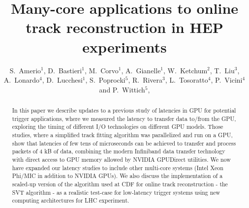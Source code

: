 \documentclass[letterpaper]{jpconf}
\begin{document}
\title{Many-core applications to online track reconstruction in HEP experiments}
\author{S.~Amerio$^1$, 
  D.~Bastieri$^1$, 
  M.~Corvo$^1$, 
  A.~Gianelle$^1$, 
  W.~Ketchum$^2$,
  T.~Liu$^3$, 
  A.~Lonardo$^4$, 
  D.~Lucchesi$^1$,
  S.~Poprocki$^5$, 
  R.~Rivera$^3$, 
  L.~Tosoratto$^4$,
  P.~Vicini$^4$
  and 
  P.~Wittich$^5$,
}
\address{$^1$ INFN and University of Padova, Italy}
\address{$^2$ Los Alamos National Laboratory, New Mexico, USA}
\address{$^3$ Fermi National Accelerator Laboratory, Illinois, USA}
\address{$^4$ INFN Roma, Italy}
\address{$^5$ Cornell University, New York, USA}


\begin{abstract}
  In this paper we describe updates to a previous study of latencies
  in GPU for potential trigger applications, where we measured the
  latency to transfer data to/from the GPU, exploring the timing of
  different I/O technologies on different GPU models.  Those studies,
  where a simplified track fitting algorithm was parallelized and run
  on a GPU, show that latencies of few tens of microseconds can be
  achieved to transfer and process packets of 4 kB of data, combining
  the modern Infiniband data transfer technology with direct access to
  GPU memory allowed by NVIDIA GPUDirect utilities.  We now have
  expanded our latency studies to include other multi-core systems
  (Intel Xeon Phi/MIC in addition to NVIDIA GPUs). We also discuss the
  implementation of a scaled-up version of the algorithm used at CDF
  for online track reconstruction - the SVT algorithm - as a realistic
  test-case for low-latency trigger systems using new computing
  architectures for LHC experiment.

\end{abstract}
\end{document}
